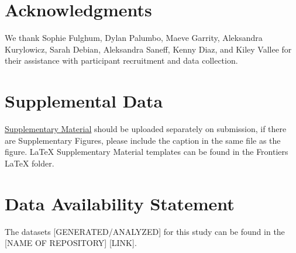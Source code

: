 \documentclass[utf8]{FrontiersinHarvard} %
\begin{document}
	
	\section*{Acknowledgments}
	We thank Sophie Fulghum, Dylan Palumbo, Maeve Garrity, Aleksandra Kurylowicz, Sarah Debian, Aleksandra Saneff, Kenny Diaz, and Kiley Vallee for their assistance with participant recruitment and data collection.
	
	\section*{Supplemental Data}
	\href{http://home.frontiersin.org/about/author-guidelines#SupplementaryMaterial}{Supplementary Material} should be uploaded separately on submission, if there are Supplementary Figures, please include the caption in the same file as the figure. LaTeX Supplementary Material templates can be found in the Frontiers LaTeX folder.
	
	\section*{Data Availability Statement}
	The datasets [GENERATED/ANALYZED] for this study can be found in the [NAME OF REPOSITORY] [LINK].
	
	
	
	
	
\end{document}
